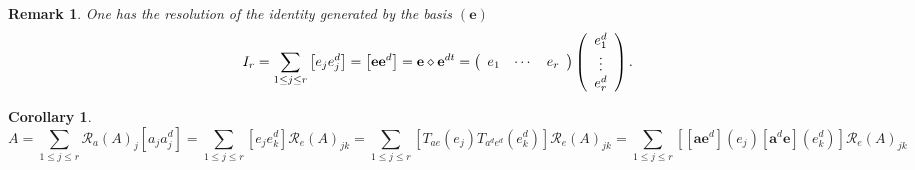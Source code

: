 \documentclass[aps,preprint]{revtex4}%
\newtheorem{corollary}[theorem]{Corollary}
\newtheorem{remark}[theorem]{Remark}
\begin{document}
\begin{remark}
One has the resolution of the identity generated by the basis $\left(
\mathbf{e}\right)  $%
\begin{equation}
I_{r}=\sum_{1\leq j\leq r}\left[  e_{j}e_{j}^{d}\right]  =\left[
\mathbf{ee}^{d}\right]  =\mathbf{e}\diamond\mathbf{e}^{dt}=\left(
\begin{array}
[c]{ccc}%
e_{1} & \cdots & e_{r}%
\end{array}
\right)  \left(
\begin{array}
[c]{c}%
e_{1}^{d}\\
\vdots\\
e_{r}^{d}%
\end{array}
\right)  .
\end{equation}

\end{remark}

\begin{corollary}%
\begin{equation}
A=\sum_{1\leq j\leq r}\mathcal{R}_{a}\left(  A\right)  _{j}\left[  a_{j}%
a_{j}^{d}\right]  =\sum_{1\leq j\leq r}\left[  e_{j}e_{k}^{d}\right]
\mathcal{R}_{e}\left(  A\right)  _{jk}=\sum_{1\leq j\leq r}\left[
T_{ae}\left(  e_{j}\right)  T_{a^{d}e^{d}}\left(  e_{k}^{d}\right)  \right]
\mathcal{R}_{e}\left(  A\right)  _{jk}=\sum_{1\leq j\leq r}\left[  \left[
\mathbf{ae}^{d}\right]  \left(  e_{j}\right)  \left[  \mathbf{a}^{d}%
\mathbf{e}\right]  \left(  e_{k}^{d}\right)  \right]  \mathcal{R}_{e}\left(
A\right)  _{jk}%
\end{equation}

\end{corollary}
\end{document}
